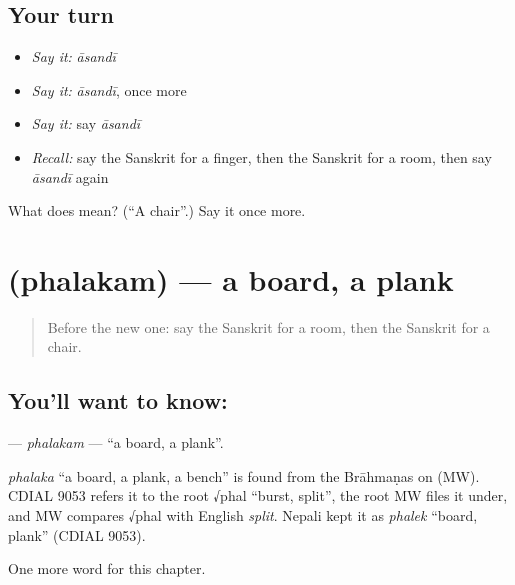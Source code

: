\subsection*{Your turn}
\begin{itemize}
\raggedright
  \item \emph{Say it:} \emph{āsandī}
  \item \emph{Say it:} \emph{āsandī}, once more
  \item \emph{Say it:} say \emph{āsandī}
  \item \emph{Recall:} say the Sanskrit for a finger, then the Sanskrit for a room, then say \emph{āsandī} again
\end{itemize}

\begin{tcolorbox}[breakable,colback=teal!4,colframe=teal!35!black,title={Before you move on}]
What does  mean? (\textquotedblleft{}A chair\textquotedblright{}.) Say it once more.
\end{tcolorbox}
\section[\texorpdfstring{\sk{फलकम्} (phalakam)}{फलकम् (phalakam)}]{ (phalakam) — a board, a plank}

\label{lesson:SA-C118-phalakam}



\begin{quote}
Before the new one: say the Sanskrit for a room, then the Sanskrit for a chair.
\end{quote}

\subsection*{You'll want to know: }
\textbf{} — \emph{phalakam} — \textquotedblleft{}a board, a plank\textquotedblright{}.

\begin{cousinweb}
\emph{phalaka} \textquotedblleft{}a board, a plank, a bench\textquotedblright{} is found from the Brāhmaṇas on (MW). CDIAL 9053 refers it to the root √phal \textquotedblleft{}burst, split\textquotedblright{}, the root MW files it under, and MW compares √phal with English \emph{split}. Nepali kept it as \emph{phalek} \textquotedblleft{}board, plank\textquotedblright{} (CDIAL 9053).
\end{cousinweb}

\begin{grammarlens}[title={What you've built}]
One more word for this chapter.
\end{grammarlens}

